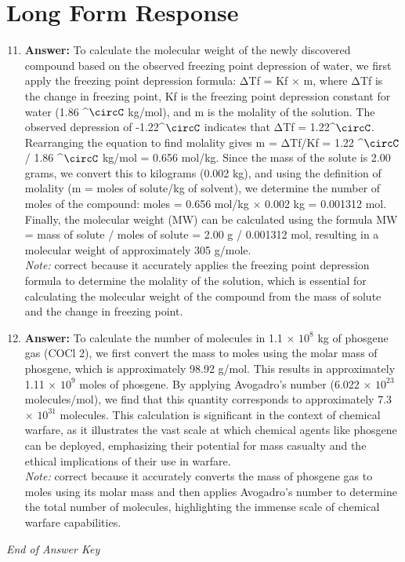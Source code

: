 \documentclass[12pt]{article}
\begin{document}
\section*{Long Form Response}
\begin{enumerate}[label=\arabic*.]
\setcounter{enumi}{10}
\item \textbf{Answer:} To calculate the molecular weight of the newly discovered compound based on the observed freezing point depression of water, we first apply the freezing point depression formula: ΔTf = Kf \ensuremath{\times} m, where ΔTf is the change in freezing point, Kf is the freezing point depression constant for water (1.86 ^\ensuremath{\circC} kg/mol), and m is the molality of the solution. The observed depression of -1.22^\ensuremath{\circC} indicates that ΔTf = 1.22^\ensuremath{\circC}. Rearranging the equation to find molality gives m = ΔTf/Kf = 1.22 ^\ensuremath{\circC} / 1.86 ^\ensuremath{\circC} kg/mol = 0.656 mol/kg. Since the mass of the solute is 2.00 grams, we convert this to kilograms (0.002 kg), and using the definition of molality (m = moles of solute/kg of solvent), we determine the number of moles of the compound: moles = 0.656 mol/kg \ensuremath{\times} 0.002 kg = 0.001312 mol. Finally, the molecular weight (MW) can be calculated using the formula MW = mass of solute / moles of solute = 2.00 g / 0.001312 mol, resulting in a molecular weight of approximately 305 g/mole.
\\ \textit{Note:} correct because it accurately applies the freezing point depression formula to determine the molality of the solution, which is essential for calculating the molecular weight of the compound from the mass of solute and the change in freezing point.
\item \textbf{Answer:} To calculate the number of molecules in 1.1 \ensuremath{\times} $10^8$ kg of phosgene gas (COCl 2), we first convert the mass to moles using the molar mass of phosgene, which is approximately 98.92 g/mol. This results in approximately 1.11 \ensuremath{\times} $10^9$ moles of phosgene. By applying Avogadro's number (6.022 \ensuremath{\times} $10^23$ molecules/mol), we find that this quantity corresponds to approximately 7.3 \ensuremath{\times} $10^31$ molecules. This calculation is significant in the context of chemical warfare, as it illustrates the vast scale at which chemical agents like phosgene can be deployed, emphasizing their potential for mass casualty and the ethical implications of their use in warfare.
\\ \textit{Note:} correct because it accurately converts the mass of phosgene gas to moles using its molar mass and then applies Avogadro's number to determine the total number of molecules, highlighting the immense scale of chemical warfare capabilities.
\end{enumerate}

\vfill
\noindent\textit{End of Answer Key}
\end{document}
